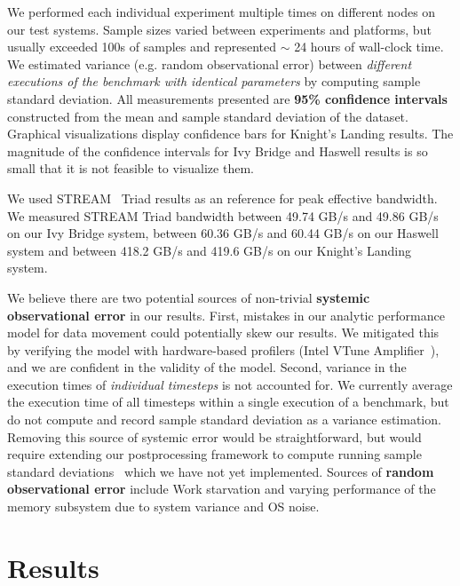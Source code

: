 \documentclass{sig-alternate-05-2015}
\begin{document}
We performed each individual experiment multiple times on different nodes on
  our test systems.
Sample sizes varied between experiments and platforms, but usually exceeded
  100s of samples and represented \(\sim\) 24 hours of wall-clock time. 
We estimated variance (e.g. random observational error) between \emph{different
  executions of the benchmark with identical parameters} by computing sample
  standard deviation.
All measurements presented are \textbf{95\% confidence intervals} constructed
  from the mean and sample standard deviation of the dataset.
Graphical visualizations display confidence bars for Knight's Landing results.
The magnitude of the confidence intervals for Ivy Bridge and Haswell results is
  so small that it is not feasible to visualize them.~\cite{benchmarking_cpp_code}

We used STREAM~\cite{stream} Triad results as an reference for peak effective
  bandwidth.
We measured STREAM Triad bandwidth between 49.74 GB/s and 49.86 GB/s on our Ivy
  Bridge system, between 60.36 GB/s and 60.44 GB/s on our Haswell system and
  between 418.2 GB/s and 419.6 GB/s on our Knight's Landing system.

We believe there are two potential sources of non-trivial \textbf{systemic
  observational error} in our results.
First, mistakes in our analytic performance model for data movement could potentially
  skew our results.
We mitigated this by verifying the model with hardware-based
  profilers (Intel VTune Amplifier~\cite{intel_vtune_amplifier}), and we are confident
  in the validity of the model.
Second, variance in the execution times of \emph{individual timesteps} is not
  accounted for.
We currently average the execution time of all timesteps
  within a single execution of a benchmark, but do not compute and record
  sample standard deviation as a variance estimation.
Removing this source of systemic error would be straightforward, but
  would require extending our postprocessing framework to compute running 
  sample standard deviations~\cite{benchmarking_cpp_code} which we have not
  yet implemented.
Sources of \textbf{random observational error} include Work starvation and
  varying performance of the memory subsystem due to system variance and OS
  noise.

\section{Results}
\label{sec:results}
\end{document}
